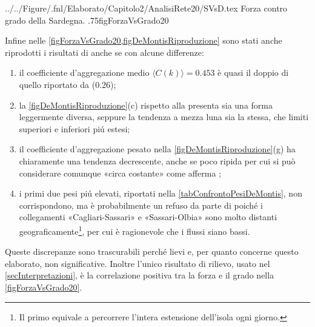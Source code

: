       {../../Figure/.fnl/Elaborato/Capitolo2/AnalisiRete20/SVsD.tex}
      {Forza contro grado della Sardegna.}
      {.75\linewidth}{figForzaVsGrado20}

    Infine nelle \cref{figForzaVsGrado20,figDeMontisRiproduzione} sono stati anche riprodotti i risultati di \cite{DeMontis2007} anche se con alcune differenze:

    \begin{enumerate}[
      label=\arabic*.,
      topsep=0.5em,
      parsep=0em,
      itemsep=0.25em,
      leftmargin=2em,
      rightmargin=1.5em,
    ]
      \item il coefficiente d'aggregazione medio \(\langle C(k)\rangle=0.453\) è quasi il doppio di quello riportato da \cite[p. 911]{DeMontis2007} (0.26);
      \item la \cref{figDeMontisRiproduzione}(c) rispetto alla \cite[Fig. 3b]{DeMontis2007} presenta sia una forma leggermente diversa, seppure la tendenza a mezza luna sia la stessa, che limiti superiori e inferiori piú estesi;
      \item il coefficiente d'aggregazione pesato nella \cref{figDeMontisRiproduzione}(g) ha chiaramente una tendenza decrescente, anche se poco ripida per cui si può considerare comunque «circa costante» come afferma \cite{DeMontis2007};
      \item i primi due pesi piú elevati, riportati nella \cref{tabConfrontoPesiDeMontis}, non corrispondono, ma è probabilmente un refuso da parte di \cite{DeMontis2007} poiché i collegamenti «Cagliari-Sassari» e «Sassari-Olbia» sono molto distanti geograficamente\footnote{Il primo equivale a percorrere l'intera estensione dell'isola ogni giorno.}, per cui è ragionevole che i flussi siano bassi.
    \end{enumerate}

    Queste discrepanze sono trascurabili perché lievi e, per quanto concerne questo elaborato, non significative. Inoltre l'unico risultato di rilievo, usato nel \cref{secInterpretazioni}, è la correlazione positiva tra la forza e il grado nella \cref{figForzaVsGrado20}.

